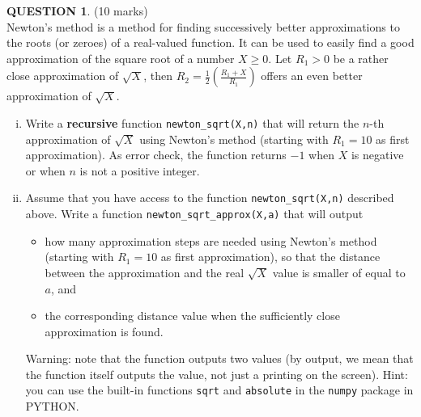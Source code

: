 \documentclass[a4paper,12pt]{article}
\theoremstyle{definition}
\newtheorem{ques}[dummy]{QUESTION}
\theoremstyle{plain}
\newcommand{\ttx}[1]{\texttt{#1}}
\newcommand{\bigbracket}[1]{\left( #1 \right)}
\newcommand{\py}{python}
\begin{document}
\begin{ques}\hfill (10 marks)\vspace*{1em}\\
	Newton's method is a method for finding successively better approximations to the roots (or zeroes) of a real-valued function. It can be used to easily find a good approximation of the square root of a number $X\geq 0$. Let $R_1 > 0$ be a rather close approximation of $\sqrt{X}$, then $R_2 = \frac{1}{2}\bigbracket{\frac{R_1+X}{R_1}}$ offers an even better approximation of $\sqrt{X}$.
	
	\begin{enumerate}[(i)]
		\begin{verbatim}
import math
if X < 0 or math.floor(n) != n:
    return -1;
if n == 1:
    R1=10;
    return R1;
else:
    Rx= 0.5 * (newton_sqrt(X,n-1)+X)/newton_sqrt(X,n-1)
    return Rx;		
		\end{verbatim}
		\item Write a \textbf{recursive} function \ttx{newton\_sqrt(X,n)} that will return the $n$-th approximation of $\sqrt{X}$ using Newton's method (starting with $R_1 = 10$ as first approximation). As error check, the function returns $-1$ when $X$ is negative or when $n$ is not a positive integer.
		
		\item Assume that you have access to the function \ttx{newton\_sqrt(X,n)} described above. Write a function \ttx{newton\_sqrt\_approx(X,a)} that will output
		\begin{itemize}
			\item how many approximation steps are needed using Newton's method (starting with $R_1 = 10$ as first approximation), so that the distance between the approximation and the real $\sqrt{X}$ value is smaller of equal to $a$, and
			\item the corresponding distance value when the sufficiently close approximation is found.
		\end{itemize}
		Warning: note that the function outputs two values (by output, we mean that the function itself outputs the value, not just a printing on the screen). Hint: you can use the built-in functions \ttx{sqrt} and \ttx{absolute} in the \ttx{numpy} package in PYTHON.
	\end{enumerate}
\end{ques}
\end{document}
